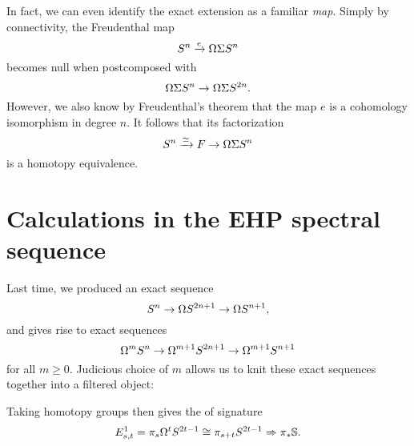 \begin{remark}
In fact, we can even identify the exact extension as a familiar \emph{map}.
Simply by connectivity, the Freudenthal map \[S^n \xrightarrow e \Omega \Sigma S^n\] becomes null when postcomposed with \[\Omega \Sigma S^n \to \Omega \Sigma S^{2n}.\]
However, we also know by Freudenthal's theorem that the map $e$ is a cohomology isomorphism in degree $n$.
It follows that its factorization \[S^n \xrightarrow\simeq F \to \Omega \Sigma S^n\] is a homotopy equivalence.
\end{remark}




\section{Calculations in the EHP spectral sequence}

Last time, we produced an exact sequence \[S^n \to \Omega S^{2n+1} \to \Omega S^{n+1},\] and  gives rise to exact sequences \[\Omega^m S^n \to \Omega^{m+1} S^{2n+1} \to \Omega^{m+1} S^{n+1}\] for all $m \ge 0$.
Judicious choice of $m$ allows us to knit these exact sequences together into a filtered object:

\begin{figure*}
\begin{center}
\end{center}
\end{figure*}

\begin{definition}
Taking homotopy groups then gives the  of signature \[E^1_{s, t} = \pi_s \Omega^t S^{2t-1} \cong \pi_{s+t} S^{2t-1} \Rightarrow \pi_* \mathbb S.\]
\end{definition}

